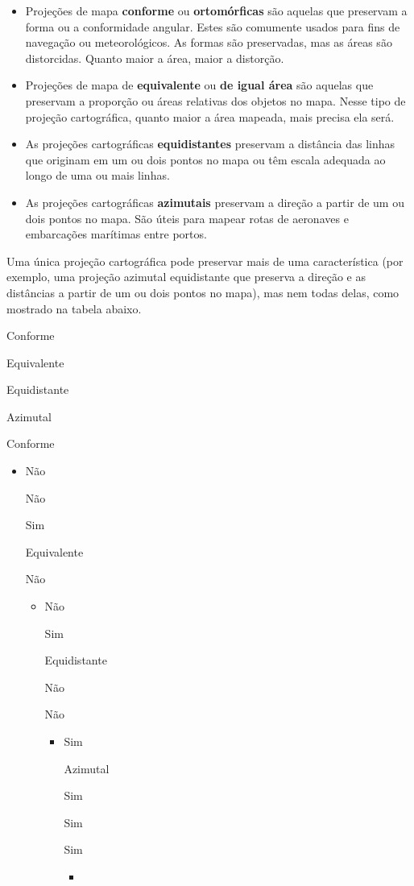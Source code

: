 \documentclass[
  portuguese,
]{krantz}
\providecommand{\tightlist}{%
  \setlength{\itemsep}{0pt}\setlength{\parskip}{0pt}}
\begin{document}
\begin{itemize}
\tightlist
\item
  Projeções de mapa \textbf{conforme} ou \textbf{ortomórficas} são aquelas que preservam a forma ou a conformidade angular. Estes são comumente usados para fins de navegação ou meteorológicos. As formas são preservadas, mas as áreas são distorcidas. Quanto maior a área, maior a distorção.
\item
  Projeções de mapa de \textbf{equivalente} ou \textbf{de igual área} são aquelas que preservam a proporção ou áreas relativas dos objetos no mapa. Nesse tipo de projeção cartográfica, quanto maior a área mapeada, mais precisa ela será.
\item
  As projeções cartográficas \textbf{equidistantes} preservam a distância das linhas que originam em um ou dois pontos no mapa ou têm escala adequada ao longo de uma ou mais linhas.
\item
  As projeções cartográficas \textbf{azimutais} preservam a direção a partir de um ou dois pontos no mapa. São úteis para mapear rotas de aeronaves e embarcações marítimas entre portos.
\end{itemize}

Uma única projeção cartográfica pode preservar mais de uma característica (por exemplo, uma projeção azimutal equidistante que preserva a direção e as distâncias a partir de um ou dois pontos no mapa), mas nem todas delas, como mostrado na tabela abaixo.

Conforme

Equivalente

Equidistante

Azimutal

Conforme

\begin{itemize}
\item
  Não

  Não

  Sim

  Equivalente

  Não

  \begin{itemize}
  \item
    Não

    Sim

    Equidistante

    Não

    Não

    \begin{itemize}
    \item
      Sim

      Azimutal

      Sim

      Sim

      Sim

      \begin{itemize}
      \tightlist
      \item
      \end{itemize}
    \end{itemize}
  \end{itemize}
\end{itemize}
\end{document}
